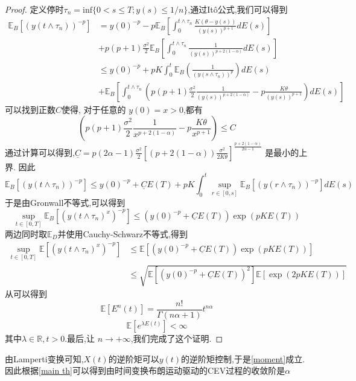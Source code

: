 \begin{proof}
	定义停时$\tau_{n}=\mathrm{inf}\{0<s\leq T;y(s)\leq1/n\}$,通过It\^{o}公式,我们可以得到
	$$\begin{aligned}
		\mathbb{E}_B\left[(y(t\wedge\tau_{n}))^{-p}\right] &=y(0)^{-p}-p\mathbb{E}_B\left[\int_{0}^{t\wedge\tau_{n}}\frac{K(\theta-y(s))}{(y(s))^{p+1}}dE(s)\right]\\
		&+p(p+1)\frac{\sigma^{2}}{2}\mathbb{E}_B\left[\int_{0}^{t\wedge\tau_{n}}\frac{1}{(y(s))^{p+2(1-\alpha)}}dE(s)\right] \\
		&\leq y(0)^{-p}+pK\int_{0}^{t}\mathbb{E}_B\left(\frac{1}{(y(s\wedge\tau_{n}))^{p}}
		\right)dE(s) \\
		&+\mathbb{E}_B\left[\int_0^{t\wedge\tau_n}\left(p(p+1)\frac{\sigma^2}{2}\frac{1}{(y(s))^{p+2(1-\alpha)}}-p\frac{K\theta}{(y(s))^{p+1}}\right)dE(s)\right]
	\end{aligned}$$
	可以找到正数$C$使得, 对于任意的 $y(0)=x>0$,都有
	$$\left(p(p+1)\frac{\sigma^2}{2}\frac{1}{x^{p+2(1-\alpha)}}-p\frac{K\theta}{x^{p+1}}\right)\leq C$$
	通过计算可以得到,$\underline C=p(2\alpha-1)\frac{\sigma^2}{2}\left[(p+2(1-\alpha))\frac{\sigma^2}{2K\theta}\right]^{\frac{p+2(1-\alpha)}{2\alpha-1}}$ 是最小的上界. 因此
	$$\mathbb{E}_B\left[(y(t\wedge\tau_n))^{-p}\right]\leq y(0)^{-p}+\underline{C}E(T)+pK\int_0^t\sup_{r\in[0,s]}\mathbb{E}_B\left[(y(r\wedge\tau_n))^{-p}\right]dE(s)$$
	于是由Gronwall不等式,可以得到
	$$\sup\limits_{t\in[0,T]}\mathbb{E}_B\left[(y(t\wedge\tau_n)^x)^{-p}\right]\leq\left(y(0)^{-p}+\underline{C}E(T)\right)\exp(pKE(T))$$
	两边同时取$\mathbb{E}_D$并使用Cauchy-Schwarz不等式,得到
	$$\begin{aligned}
		\sup\limits_{t\in[0,T]}\mathbb{E}\left[(y(t\wedge\tau_n)^x)^{-p}\right]&\leq\mathbb{E}\left[\left(y(0)^{-p}+\underline{C}E(T)\right)\exp(pKE(T))\right]\\
		&\leq\sqrt{\mathbb{E}\left[\left(y(0)^{-p}+\underline{C}E(T)\right)^2\right]\mathbb{E}\left[\exp(2pKE(T))\right]}
	\end{aligned}$$
	从\cite{jum2014strong}可以得到
	\begin{equation}
		\mathbb{E}[E^n(t)]=\frac{n!}{\Gamma(n\alpha+1)}t^{n\alpha}
	\end{equation}
	\begin{equation}
		\mathbb{E}[e^{\lambda E(t)}]<\infty
	\end{equation}
	其中$\lambda \in \mathbb{R},t>0$.最后,让 $n\to+\infty$,我们完成了这个证明.
\end{proof}


由Lamperti变换可知,$X(t)$的逆阶矩可以$y(t)$的逆阶矩控制,于是\cref{moment}成立.因此根据\cref{main th}可以得到由时间变换布朗运动驱动的CEV过程的收敛阶是$\alpha$
\

